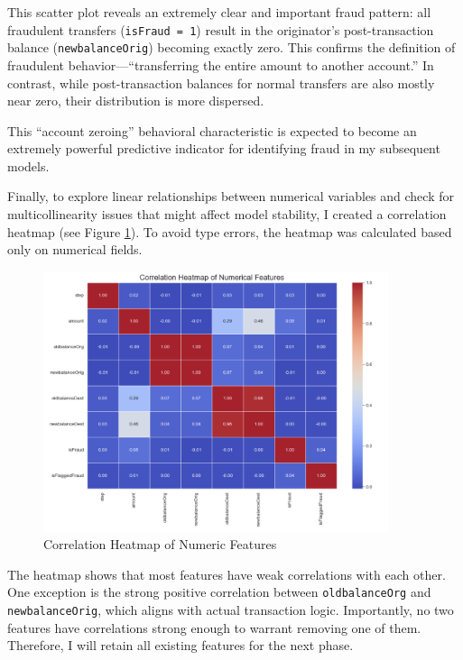 \documentclass[sigplan,screen]{acmart}
\begin{document}
This scatter plot reveals an extremely clear and important fraud pattern: all fraudulent transfers (\texttt{isFraud = 1}) result in the originator's post-transaction balance (\texttt{newbalanceOrig}) becoming exactly zero. This confirms the definition of fraudulent behavior---``transferring the entire amount to another account.'' In contrast, while post-transaction balances for normal transfers are also mostly near zero, their distribution is more dispersed.

This ``account zeroing'' behavioral characteristic is expected to become an extremely powerful predictive indicator for identifying fraud in my subsequent models.

Finally, to explore linear relationships between numerical variables and check for multicollinearity issues that might affect model stability, I created a correlation heatmap (see Figure \ref{fig:correlation_heatmap}). To avoid type errors, the heatmap was calculated based only on numerical fields.

\begin{figure}[h!]
    \centering
    \includegraphics[width=0.9\textwidth]{2.3.4.png}
    \caption{Correlation Heatmap of Numeric Features}
    \label{fig:correlation_heatmap}
\end{figure}

The heatmap shows that most features have weak correlations with each other. One exception is the strong positive correlation between \texttt{oldbalanceOrg} and \texttt{newbalanceOrig}, which aligns with actual transaction logic. Importantly, no two features have correlations strong enough to warrant removing one of them. Therefore, I will retain all existing features for the next phase.
\end{document}
